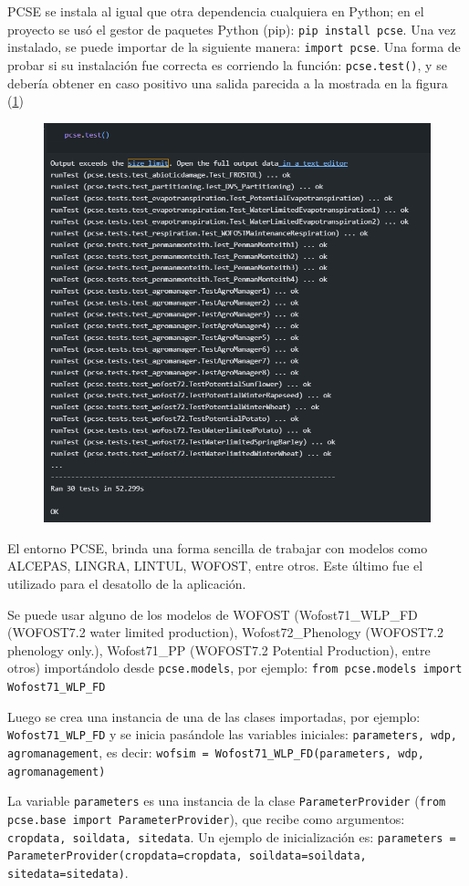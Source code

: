 PCSE se instala al igual que otra dependencia cualquiera en Python; en el proyecto se usó el gestor de paquetes Python (pip): \lstinline|pip install pcse|.
Una vez instalado, se puede importar de la siguiente manera: \lstinline[alsolanguage=python]|import pcse|. Una forma de probar si su instalación fue correcta es corriendo la función: \lstinline[alsolanguage=python]|pcse.test()|, y se debería obtener en caso positivo una salida parecida a la mostrada en la figura (\ref{fig:pcse-test})

\begin{figure}[!h]
	\centering
	\includegraphics[width=0.4\linewidth]{Images/pcse-test}
	\caption{}
	\label{fig:pcse-test}
\end{figure}

El entorno PCSE, brinda una forma sencilla de trabajar con modelos como ALCEPAS, LINGRA, LINTUL, WOFOST, entre otros. Este último fue el utilizado para el desatollo de la aplicación.

Se puede usar alguno de los modelos de WOFOST (Wofost71\_WLP\_FD (WOFOST7.2 water limited production), Wofost72\_Phenology (WOFOST7.2 phenology only.), Wofost71\_PP (WOFOST7.2 Potential Production), entre otros) importándolo desde \lstinline|pcse.models|, por ejemplo: \lstinline[alsolanguage=python]|from pcse.models import Wofost71_WLP_FD|

Luego se crea una instancia de una de las clases importadas, por ejemplo: \lstinline|Wofost71_WLP_FD| y se inicia pasándole las variables iniciales: \lstinline|parameters, wdp, agromanagement|, es decir:
\lstinline[alsolanguage=python]|wofsim = Wofost71_WLP_FD(parameters, wdp, agromanagement)|

La variable \lstinline|parameters| es una instancia de la clase \lstinline|ParameterProvider| (\lstinline[alsolanguage=python]|from pcse.base import ParameterProvider|), que recibe como argumentos: \lstinline|cropdata, soildata, sitedata|. Un ejemplo de inicialización es:
\lstinline[alsolanguage=python]|parameters = ParameterProvider(cropdata=cropdata, soildata=soildata, sitedata=sitedata)|.\\


